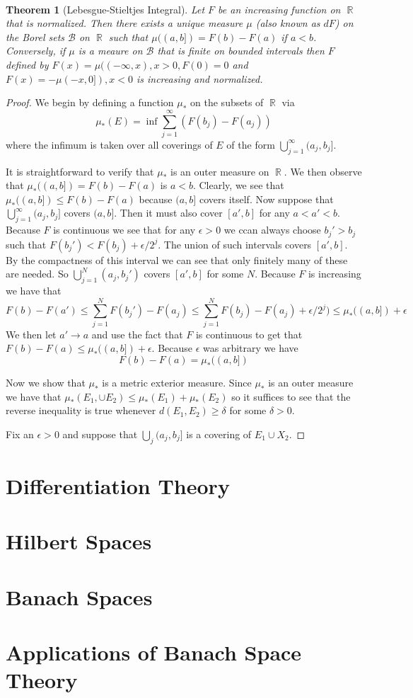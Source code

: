 \documentclass{article}
\DeclareMathOperator{\R}{\mathbb{R}}
\newtheorem*{thm}{\\ Theorem}
\begin{document}
\begin{thm}[Lebesgue-Stieltjes Integral]
  Let $F$ be an increasing function on $\R$ that is normalized. Then
  there exists a unique measure $\mu$ (also known as $dF$) on the
  Borel sets $\mathcal{B}$ on $\R$ such that $\mu((a,b]) = F(b) -
  F(a)$ if $a<b$. Conversely, if $\mu$ is a meaure on $\mathcal{B}$
  that is finite on bounded intervals then $F$ defined by $F(x) =
  \mu((-\infty, x), x > 0, F(0) = 0$ and $F(x) = - \mu(-x, 0]), x < 0$
  is increasing and normalized.
\end{thm}
\begin{proof}
  We begin by defining a function $\mu_*$ on the subsets of $\R$ via
  \[
  \mu_*(E) = \inf \sum_{j=1}^\infty (F(b_j) - F(a_j))
  \]
  where the infimum is taken over all coverings of $E$ of the form
  $\bigcup_{j=1}^\infty (a_j, b_j]$.

  It is straightforward to verify that $\mu_*$ is an outer measure on
  $\R$. We then observe that $\mu_*((a,b]) = F(b) - F(a)$ is
  $a<b$. Clearly, we see that $\mu_*((a,b]) \leq F(b) - F(a)$ because
  $(a, b]$ covers itself. Now suppose that $\bigcup_{j=1}^\infty
  (a_j,b_j]$ covers $(a,b]$. Then it must also cover $[a',b]$ for any
  $a < a' < b$. Because $F$ is continuous we see that for any
  $\epsilon >0$ we ccan always choose $b_j' > b_j$ such that $F(b_j')
  < F(b_j) + \epsilon/2^j$. The union of such intervals covers
  $[a',b]$. By the compactness of this interval we can see that only
  finitely many of these are needed. So $\bigcup_{j=1}^N(a_j,b_j')$
  covers $[a',b]$ for some $N$. Because $F$ is increasing we have that
  \[
  F(b) - F(a') \leq \sum_{j=1}^N F(b_j') - F(a_j) \leq \sum_{j=1}^N
  F(b_j) - F(a_j) + \epsilon/2^j) \leq \mu_*((a,b]) + \epsilon
  \]
  We then let $a' \to a$ and use the fact that $F$ is continuous to
  get that $F(b) - F(a) \leq \mu_*((a,b]) + \epsilon$. Because
  $\epsilon$ was arbitrary we have
  \[
  F(b) - F(a) = \mu_*((a,b])
  \]

  Now we show that $\mu_*$ is a metric exterior measure. Since $\mu_*$
  is an outer measure we have that $\mu_*(E_1,\cup E_2) \leq
  \mu_*(E_1) + \mu_*(E_2)$ so it suffices to see that the reverse
  inequality is true whenever $d(E_1,E_2) \geq \delta$ for some
  $\delta > 0$.

  Fix an $\epsilon >0$ and suppose that $\bigcup_j (a_j,b_j]$ is a
  covering of $E_1 \cup X_2$.
\end{proof}

\section{Differentiation Theory}

\section{Hilbert Spaces}

\section{Banach Spaces}

\section{Applications of Banach Space Theory}
\end{document}
